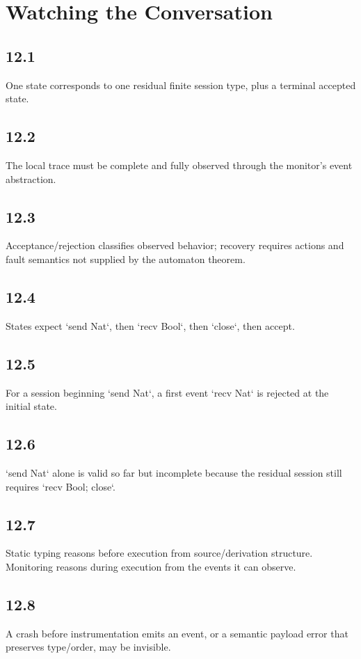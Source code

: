 \chapter{Watching the Conversation}

\section*{12.1}
One state corresponds to one residual finite session type, plus a terminal accepted state.

\section*{12.2}
The local trace must be complete and fully observed through the monitor's event abstraction.

\section*{12.3}
Acceptance/rejection classifies observed behavior; recovery requires actions and fault semantics not supplied by the automaton theorem.

\section*{12.4}
States expect `send Nat`, then `recv Bool`, then `close`, then accept.

\section*{12.5}
For a session beginning `send Nat`, a first event `recv Nat` is rejected at the initial state.

\section*{12.6}
`send Nat` alone is valid so far but incomplete because the residual session still requires `recv Bool; close`.

\section*{12.7}
Static typing reasons before execution from source/derivation structure. Monitoring reasons during execution from the events it can observe.

\section*{12.8}
A crash before instrumentation emits an event, or a semantic payload error that preserves type/order, may be invisible.

